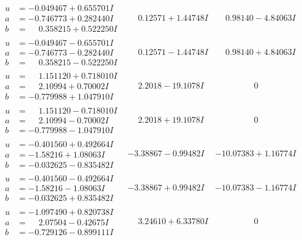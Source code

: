 \documentclass[1p]{elsarticle_modified}
\theoremstyle{definition}
\begin{document}
$$\begin{array}{c|c|c}
\begin{aligned}
u &= -0.049467 + 0.655701 I \\
a &= -0.746773 + 0.282440 I \\
b &= \phantom{-}0.358215 + 0.522250 I\end{aligned}
 & \phantom{-}0.12571 + 1.44748 I & \phantom{-}0.98140 - 4.84063 I \\ \hline\begin{aligned}
u &= -0.049467 - 0.655701 I \\
a &= -0.746773 - 0.282440 I \\
b &= \phantom{-}0.358215 - 0.522250 I\end{aligned}
 & \phantom{-}0.12571 - 1.44748 I & \phantom{-}0.98140 + 4.84063 I \\ \hline\begin{aligned}
u &= \phantom{-}1.151120 + 0.718010 I \\
a &= \phantom{-}2.10994 + 0.70002 I \\
b &= -0.779988 + 1.047910 I\end{aligned}
 & \phantom{-}2.2018 - 19.1078 I & \phantom{-0.000000 } 0 \\ \hline\begin{aligned}
u &= \phantom{-}1.151120 - 0.718010 I \\
a &= \phantom{-}2.10994 - 0.70002 I \\
b &= -0.779988 - 1.047910 I\end{aligned}
 & \phantom{-}2.2018 + 19.1078 I & \phantom{-0.000000 } 0 \\ \hline\begin{aligned}
u &= -0.401560 + 0.492664 I \\
a &= -1.58216 + 1.08063 I \\
b &= -0.032625 - 0.835482 I\end{aligned}
 & -3.38867 - 0.99482 I & -10.07383 + 1.16774 I \\ \hline\begin{aligned}
u &= -0.401560 - 0.492664 I \\
a &= -1.58216 - 1.08063 I \\
b &= -0.032625 + 0.835482 I\end{aligned}
 & -3.38867 + 0.99482 I & -10.07383 - 1.16774 I \\ \hline\begin{aligned}
u &= -1.097490 + 0.820738 I \\
a &= \phantom{-}2.07504 - 0.42675 I \\
b &= -0.729126 - 0.899111 I\end{aligned}
 & \phantom{-}3.24610 + 6.33780 I & \phantom{-0.000000 } 0\\

\end{array}$$
\end{document}

